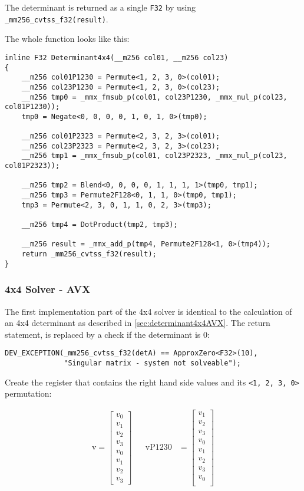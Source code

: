 \documentclass[fontsize = 10pt,DIV = 13]{scrartcl}
\begin{document}
The determinant is returned as a single \texttt{F32} by using \texttt{_mm256_cvtss_f32(result)}.

The whole function looks like this:
\begin{verbatim}
inline F32 Determinant4x4(__m256 col01, __m256 col23)
{
    __m256 col01P1230 = Permute<1, 2, 3, 0>(col01);
    __m256 col23P1230 = Permute<1, 2, 3, 0>(col23);
    __m256 tmp0 = _mmx_fmsub_p(col01, col23P1230, _mmx_mul_p(col23, col01P1230));
    tmp0 = Negate<0, 0, 0, 0, 1, 0, 1, 0>(tmp0);

    __m256 col01P2323 = Permute<2, 3, 2, 3>(col01);
    __m256 col23P2323 = Permute<2, 3, 2, 3>(col23);
    __m256 tmp1 = _mmx_fmsub_p(col01, col23P2323, _mmx_mul_p(col23, col01P2323));

    __m256 tmp2 = Blend<0, 0, 0, 0, 1, 1, 1, 1>(tmp0, tmp1);
    __m256 tmp3 = Permute2F128<0, 1, 1, 0>(tmp0, tmp1);
    tmp3 = Permute<2, 3, 0, 1, 1, 0, 2, 3>(tmp3);

    __m256 tmp4 = DotProduct(tmp2, tmp3);

    __m256 result = _mmx_add_p(tmp4, Permute2F128<1, 0>(tmp4));
    return _mm256_cvtss_f32(result);
}
\end{verbatim}

\subsubsection{4x4 Solver - AVX}

The first implementation part of the 4x4 solver is identical to the calculation of an 4x4 determinant as described in \cref{sec:determinant4x4AVX}. The return statement, is replaced by a check if the determinant is 0:
\begin{verbatim}
DEV_EXCEPTION(_mm256_cvtss_f32(detA) == ApproxZero<F32>(10), 
              "Singular matrix - system not solveable");
\end{verbatim} 

Create the register that contains the right hand side values and its 
\texttt{<1, 2, 3, 0>} permutation:

\begin{align*}
\mathrm{v} 
=
\begin{bmatrix}
v_0\\
v_1\\
v_2\\
v_3\\
v_0\\
v_1\\
v_2\\
v_3
\end{bmatrix}
&&
\mathrm{vP1230} 
&=
\begin{bmatrix}
v_1\\
v_2\\
v_3\\
v_0\\
v_1\\
v_2\\
v_3\\
v_0\\
\end{bmatrix}
\end{align*}
\end{document}
